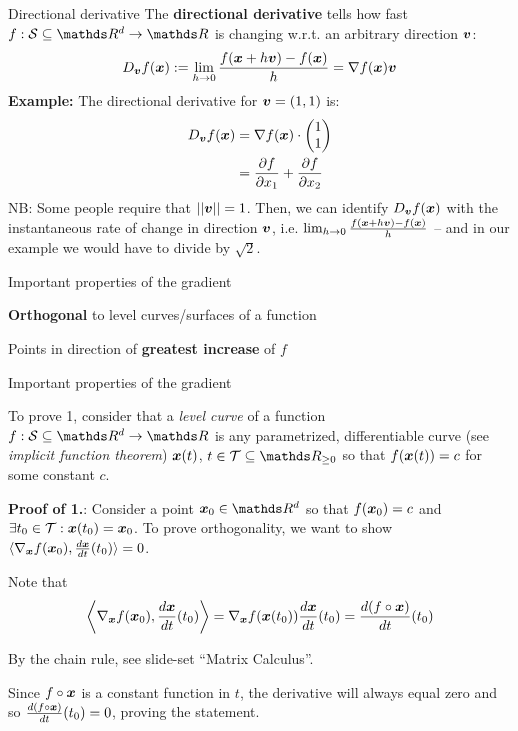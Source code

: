 \documentclass[11pt,compress,t,notes=noshow, xcolor=table]{beamer}
\begin{document}
\begin{framev}{Directional derivative}
The \textbf{directional derivative} tells how fast $f: \S\subseteq \R^d \to \R$ is changing w.r.t. an arbitrary direction $\bm{v}$:
$$
D_{\bm{v}} f(\bm{x}) := \lim_{h \to 0} \frac{f(\bm{x} + h \bm{v}) - f(\bm{x})}{h} = \nabla f(\bm{x}) \bm{v}
$$
\textbf{Example:} The directional derivative for $\bm{v} = (1, 1)$ is:
$$
\begin{aligned}
D_{\bm{v}} f(\bm{x}) &= \nabla f(\bm{x}) \cdot \begin{pmatrix} 1 \\ 1 \end{pmatrix} \\
&= \frac{\partial f}{\partial x_1} + \frac{\partial f}{\partial x_2}
\end{aligned}
$$
NB: Some people require that $||\bm{v}|| = 1$. Then, we can identify $D_{\bm{v}} f(\bm{x})$ with the instantaneous rate of change in direction $\bm{v}$, i.e. $\lim_{h \to 0} \frac{f(\bm{x} + h \bm{v}) - f(\bm{x})}{h}$ -- and in our example we would have to divide by $\sqrt{2}$.
\end{framev}


\begin{framei}{Important properties of the gradient}
\item \textbf{Orthogonal} to level curves/surfaces of a function
\item Points in direction of \textbf{greatest increase} of $f$
\vfill
{}
\end{framei}


\begin{framei}[fs=small]{Important properties of the gradient}
\item To prove 1, consider that a \emph{level curve} of a function $f: \S\subseteq \R^d \to \R$ is any parametrized, differentiable curve (see \emph{implicit function theorem}) $\bm{x}(t)$, $t\in\mathcal{T}\subseteq\R_{\geq 0}$ so that $f(\bm{x}(t))=c$ for some constant $c$.
\item \textbf{Proof of 1.}: Consider a point $\xv_0\in\R^d$ so that $f(\bm{x}_0)=c$ and $\exists t_0\in\mathcal{T}: \bm{x}(t_0)=\bm{x}_0$. To prove orthogonality, we want to show $\langle\nabla_{\bm{x}}f(\bm{x}_0),\frac{d \bm{x}}{d t}(t_0)\rangle=0$.
\item Note that
$$
\left\langle\nabla_{\bm{x}}f(\bm{x}_0),\frac{d \bm{x}}{d t}(t_0)\right\rangle
=\nabla_{\bm{x}}f(\bm{x}(t_0))\frac{d \bm{x}}{d t}(t_0)
=\frac{d (f\circ \bm{x})}{d t}(t_0)
$$
\begin{footnotesize}
By the chain rule, see slide-set ``Matrix Calculus''.
\end{footnotesize}
\item Since $f\circ \bm{x}$ is a constant function in $t$, the derivative will always equal zero and so $\frac{d (f\circ \bm{x})}{d t}(t_0)=0$, proving the statement.
\end{framei}
\end{document}
